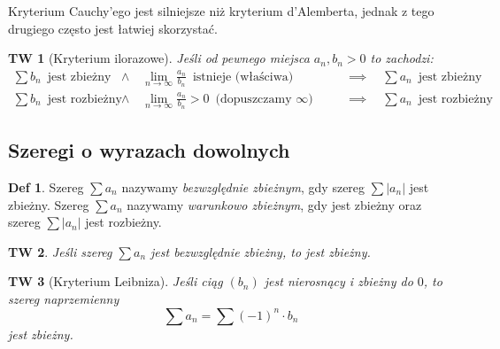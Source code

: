 \documentclass[a4paper, 12pt]{mwart}
\theoremstyle{definition}
\newtheorem{definicja}{Def}[section]
\theoremstyle{plain}
\newtheorem{twierdzenie}{TW}[section]
\theoremstyle{remark}
\begin{document}
Kryterium Cauchy'ego jest silniejsze niż kryterium d'Alemberta, jednak z tego drugiego często jest łatwiej skorzystać.
\begin{twierdzenie}[Kryterium ilorazowe]
	Jeśli od pewnego miejsca $a_n, b_n > 0$ to zachodzi:
	\begin{equation}
		\begin{aligned}
			\sum b_n \,\,\,\text{jest zbieżny}\quad &\land \quad \lim_{n\to\infty}\frac{a_n}{b_n} \,\,\, \text{istnieje (właściwa)}\quad&&\implies\quad \sum a_n \,\,\, \text{jest zbieżny} \\
			\sum b_n \,\,\,\text{jest rozbieżny}\quad &\land \quad \lim_{n\to\infty}\frac{a_n}{b_n} > 0 \,\,\,\text{(dopuszczamy $\infty$)}\quad&&\implies\quad \sum a_n \,\,\, \text{jest rozbieżny}
		\end{aligned}
	\end{equation}
\end{twierdzenie}
\subsection{Szeregi o wyrazach dowolnych}
\begin{definicja}
	Szereg $\sum a_n$ nazywamy \emph{bezwzględnie zbieżnym}, gdy szereg $\sum |a_n|$ jest zbieżny.
	Szereg $\sum a_n$ nazywamy \emph{warunkowo zbieżnym}, gdy jest zbieżny oraz szereg $\sum |a_n|$ jest rozbieżny.
\end{definicja}
\begin{twierdzenie}
	Jeśli szereg $\sum a_n$ jest bezwzględnie zbieżny, to jest zbieżny.
\end{twierdzenie}
\begin{twierdzenie}[Kryterium Leibniza]
	Jeśli ciąg $(b_n)$ jest \emph{nierosnący i zbieżny do $0$}, to szereg naprzemienny
	\begin{equation}
		\sum a_n = \sum {(-1)}^n \cdot b_n
	\end{equation}
	jest zbieżny.
\end{twierdzenie}
\end{document}
